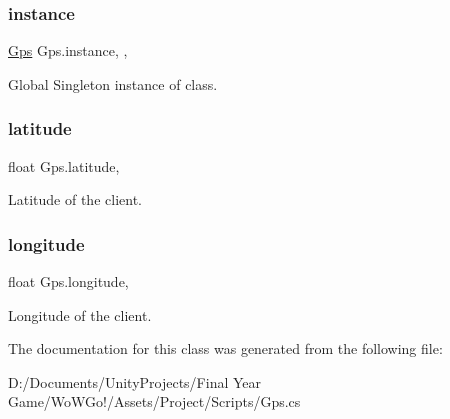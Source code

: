 \subsubsection{\texorpdfstring{instance}{instance}}
{\footnotesize\ttfamily \mbox{\hyperlink{class_gps}{Gps}} Gps.\+instance\hspace{0.3cm}{\ttfamily [static]}, {\ttfamily [get]}, {\ttfamily [set]}}



Global Singleton instance of class. 

\mbox{\label{class_gps_ad60149a07acd29cb3a7084143edbbf62}} 
\subsubsection{\texorpdfstring{latitude}{latitude}}
{\footnotesize\ttfamily float Gps.\+latitude\hspace{0.3cm}{\ttfamily [get]}, {}}



Latitude of the client. 

\mbox{\label{class_gps_a49d352c8f5b59c35272483e6aef7aea2}} 
\subsubsection{\texorpdfstring{longitude}{longitude}}
{\footnotesize\ttfamily float Gps.\+longitude\hspace{0.3cm}{\ttfamily [get]}, {}}



Longitude of the client. 



The documentation for this class was generated from the following file\+:\begin{DoxyCompactItemize}
\item 
D\+:/\+Documents/\+Unity\+Projects/\+Final Year Game/\+Wo\+W\+Go!/\+Assets/\+Project/\+Scripts/Gps.\+cs\end{DoxyCompactItemize}
